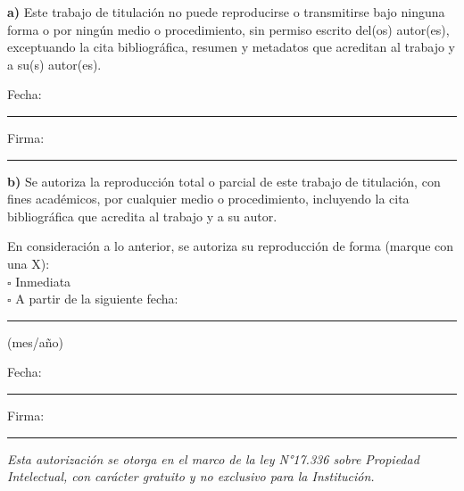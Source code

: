 \begin{singlespace}
\noindent
\textbf{a)} \quad Este trabajo de titulación no puede reproducirse o transmitirse bajo ninguna forma o por ningún medio o procedimiento, sin permiso escrito del(os) autor(es), exceptuando la cita bibliográfica, resumen y metadatos que acreditan al trabajo y a su(s) autor(es).

\vspace{0.5cm}
\noindent
Fecha: \rule{4cm}{0.4pt} \hfill Firma: \rule{5cm}{0.4pt}

\vspace{1cm}

\noindent
\textbf{b)} \quad Se autoriza la reproducción total o parcial de este trabajo de titulación, con fines académicos, por cualquier medio o procedimiento, incluyendo la cita bibliográfica que acredita al trabajo y a su autor.

\vspace{0.3cm}
\noindent
En consideración a lo anterior, se autoriza su reproducción de forma (marque con una X):\\[0.3cm]
$\square$ Inmediata\\[0.2cm]
$\square$ A partir de la siguiente fecha: \rule{3cm}{0.4pt} (mes/año)

\vspace{0.5cm}
\noindent
Fecha: \rule{4cm}{0.4pt} \hfill Firma: \rule{5cm}{0.4pt}
\end{singlespace}

\vspace{1cm}

\begin{singlespace}
\noindent
\small\textit{Esta autorización se otorga en el marco de la ley N°17.336 sobre Propiedad Intelectual, con carácter gratuito y no exclusivo para la Institución.}
\end{singlespace}

\newpage
